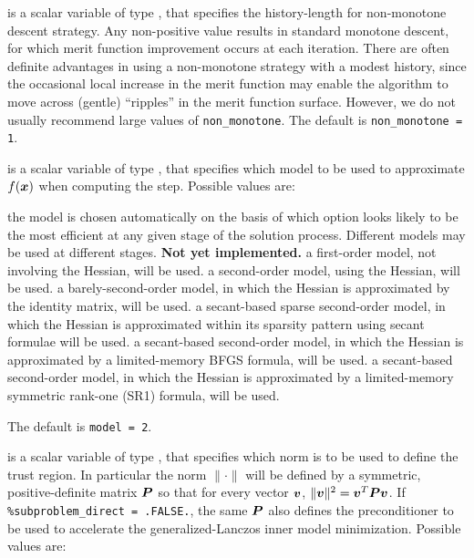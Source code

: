 \documentclass{galahad}
\begin{document}
\begin{description}
 is a scalar variable of type \integer, that
specifies the history-length for non-monotone descent strategy.
Any non-positive value results in standard monotone descent, for which
merit function improvement occurs at each iteration. There are often
definite advantages in using a non-monotone strategy with a modest history,
since the occasional local increase in the merit function may
enable the algorithm to move across (gentle) ``ripples'' in
the merit function surface.
However, we do not usually recommend large values of {\tt non\_monotone}.
The default is {\tt non\_monotone = 1}.

 is a scalar variable of type \integer, that specifies
which model to be used to approximate $f({\bm{x}})$ when computing the step.
Possible values are:

\begin{description}
 the model is chosen automatically on the basis of which option looks
        likely to be the most efficient at any given stage of the solution
        process. Different models may be used at different stages.
        {\bf Not yet implemented.}
 a first-order model, not involving the Hessian, will be used.
 a second-order model, using the Hessian, will be used.
 a barely-second-order model, in which the Hessian is approximated
        by the identity matrix, will be used.
 a secant-based sparse second-order model, in which the Hessian is
        approximated within its sparsity pattern using secant formulae will
        be used.
 a secant-based second-order model, in which the Hessian is approximated
        by a limited-memory BFGS formula, will be used.
 a secant-based second-order model, in which the Hessian is approximated
        by a limited-memory symmetric rank-one (SR1) formula, will be used.
\end{description}
The default is {\tt model = 2}.

 is a scalar variable of type \integer,
that specifies which norm is to be used to define the trust region.
In particular the norm $\|\cdot\|$ will be defined by a symmetric,
positive-definite matrix ${\bm{P}}$ so that for every vector ${\bm{v}}$,
$\|{\bm{v}}\|^2 = {\bm{v}}^T {\bm{P}} {\bm{v}}$.
If {\tt \%subproblem\_direct = .FALSE.}, the same ${\bm{P}}$ also defines the
preconditioner to be used to accelerate the generalized-Lanczos
inner model minimization.  Possible values are:


\end{description}
\end{document}
